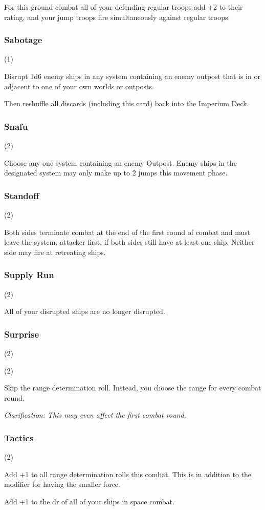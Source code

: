 
For this ground combat all of your defending regular troops add +2 to their rating, and your jump troops fire simultaneously against regular troops.

\subsubsection{Sabotage} (1)


Disrupt 1d6 enemy ships in any system containing an enemy outpost that is in or adjacent to one of your own worlds or outposts.

Then reshuffle all discards (including this card) back into the Imperium Deck.

\subsubsection{Snafu} (2)


Choose any one system containing an enemy Outpost. Enemy ships in the designated system may only make up to 2 jumps this movement phase.

\subsubsection{Standoff} (2)


Both sides terminate combat at the end of the first round of combat and must leave the system, attacker first, if both sides still have at least one ship. Neither side may fire at retreating ships.

\subsubsection{Supply Run} (2)


All of your disrupted ships are no longer disrupted.

\subsubsection{Surprise} (2)

 (2)

Skip the range determination roll. Instead, you choose the range for every combat round.

\textit{Clarification: This may even affect the first combat round.}

\subsubsection{Tactics} (2)


Add +1 to all range determination rolls this combat. This is in addition to the modifier for having the smaller force.

Add +1 to the dr of all of your ships in space combat.